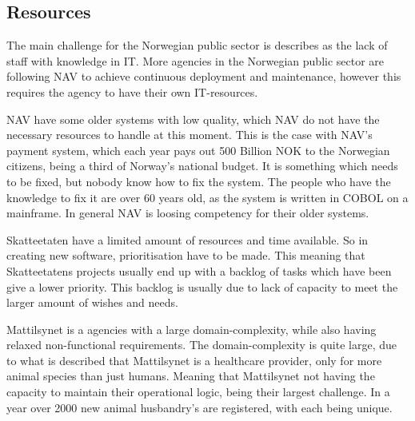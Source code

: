 

\subsection{Resources}
The main challenge for the Norwegian public sector is describes as the lack of staff with knowledge in IT. More agencies in the Norwegian public sector are following NAV to achieve continuous deployment and maintenance, however this requires the agency to have their own IT-resources.

NAV have some older systems with low quality, which NAV do not have the necessary resources to handle at this moment. This is the case with NAV's payment system, which each year pays out 500 Billion NOK to the Norwegian citizens, being a third of Norway's national budget. It is something which needs to be fixed, but nobody know how to fix the system. The people who have the knowledge to fix it are over 60 years old, as the system is written in COBOL on a mainframe. In general NAV is loosing competency for their older systems.

Skatteetaten have a limited amount of resources and time available. So in creating new software, prioritisation have to be made. This meaning that Skatteetatens projects usually end up with a backlog of tasks which have been give a lower priority. This backlog is usually due to lack of capacity to meet the larger amount of wishes and needs.

Mattilsynet is a agencies with a large domain-complexity, while also having relaxed non-functional requirements. The domain-complexity is quite large, due to what is described that Mattilsynet is a healthcare provider, only for more animal species than just humans. Meaning that Mattilsynet not having the capacity to maintain their operational logic, being their largest challenge. In a year over 2000 new animal husbandry's are registered, with each being unique.  

